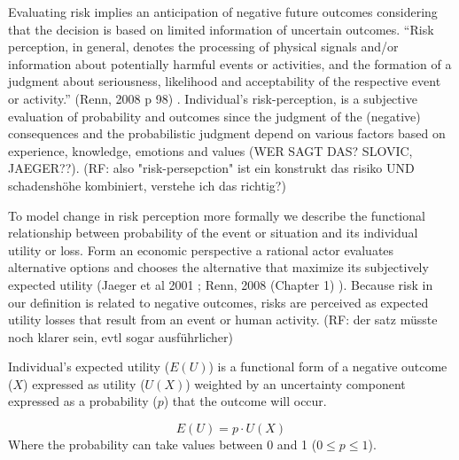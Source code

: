 Evaluating risk implies an anticipation of negative future outcomes considering that the decision is based on limited information of uncertain outcomes. ``Risk perception, in general, denotes the processing of physical signals and/or information about potentially harmful events or activities, and the formation of a judgment about seriousness, likelihood and acceptability of the respective event or activity.''  (Renn, 2008 p 98) \citep[98]{Renn:2008wq}. Individual's risk-perception, is a subjective evaluation of probability and outcomes since the judgment of the (negative) consequences and the probabilistic judgment depend on various factors based on experience, knowledge, emotions and values (WER SAGT DAS? SLOVIC, JAEGER??).   (RF: also "risk-persepction" ist ein konstrukt das risiko UND schadenshöhe kombiniert, verstehe ich das richtig?) 
 
To model change in risk perception more formally we describe the functional relationship between probability of the event or situation and its individual utility or loss. 
Form an economic perspective a rational actor evaluates alternative options and chooses the alternative that maximize its subjectively expected utility (Jaeger et al 2001 \citep{Jaeger:2001wv}; Renn, 2008 (Chapter 1) \citep{Renn:2008wq}). Because risk in our definition is related to negative outcomes, risks are perceived as expected utility losses that result from an event or human activity. (RF: der satz müsste noch klarer sein, evtl sogar ausführlicher)
  
Individual's expected utility ($E(U)$) is a functional form of a negative outcome ($X$) expressed as utility ($U(X)$) weighted by an uncertainty component expressed as a probability ($p$) that the outcome will occur.  

\begin{equation}
   E(U) =  p \cdot U(X)  \nonumber
\end{equation}
Where the probability can take values between 0 and 1 ($0 \leq p \leq 1$). 

